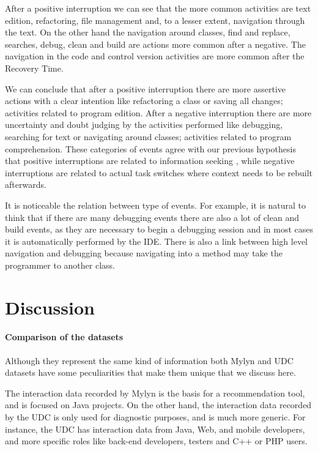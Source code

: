 \documentclass[times]{smrauth}
\begin{document}
After a positive interruption we can see that the more common activities are text edition, refactoring, file management and, to a lesser extent, navigation through the text. On the other hand the navigation around classes, find and replace, searches, debug, clean and build are actions more common after a negative. The navigation in the code and control version activities are more common after the Recovery Time.

We can conclude that after a positive interruption there are more assertive actions with a clear intention like refactoring a class or saving all changes; activities related to program edition. After a negative interruption there are more uncertainty and doubt judging by the activities performed like debugging, searching for text or navigating around classes; activities related to program comprehension. These categories of events agree with our previous hypothesis that positive interruptions are related to information seeking \cite{PR11, LVD06}, while negative interruptions are related to actual task switches where context needs to be rebuilt afterwards.

It is noticeable the relation between type of events. For example, it is natural to think that if there are many debugging events there are also a lot of clean and build events, as they are necessary to begin a debugging session and in most cases it is automatically performed by the IDE. There is also a link between high level navigation and debugging because navigating into a method may take the programmer to another class.

\section{Discussion}

\paragraph{Comparison of the datasets}
Although they represent the same kind of information both Mylyn and UDC datasets have some peculiarities that make them unique that we discuss here.

The interaction data recorded by Mylyn is the basis for a recommendation tool, and is focused on Java projects. On the other hand, the interaction data recorded by the UDC is only used for diagnostic purposes, and is much more generic. For instance, the UDC has interaction data from Java, Web, and mobile developers, and more specific roles like back-end developers, testers and C++ or PHP users. 
\end{document}

